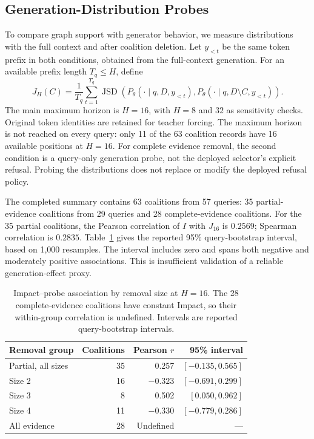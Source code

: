 \documentclass[sigconf]{aamas}
\begin{document}
\subsection{Generation-Distribution Probes}
\label{sec:probe}
To compare graph support with generator behavior, we measure distributions with the full context and after coalition deletion. Let $y_{<t}$ be the same token prefix in both conditions, obtained from the full-context generation. For an available prefix length $T_q\leq H$, define
\begin{equation}
J_H(C)=\frac{1}{T_q}\sum_{t=1}^{T_q}\operatorname{JSD}\!\left(
P_\theta(\cdot\mid q,D,y_{<t}),
P_\theta(\cdot\mid q,D\setminus C,y_{<t})\right).
\label{eq:probe}
\end{equation}
The main maximum horizon is $H=16$, with $H=8$ and $32$ as sensitivity checks. Original token identities are retained for teacher forcing. The maximum horizon is not reached on every query: only 11 of the 63 coalition records have 16 available positions at $H=16$. For complete evidence removal, the second condition is a query-only generation probe, not the deployed selector's explicit refusal. Probing the distributions does not replace or modify the deployed refusal policy.

The completed summary contains 63 coalitions from 57 queries: 35 partial-evidence coalitions from 29 queries and 28 complete-evidence coalitions. For the 35 partial coalitions, the Pearson correlation of $I$ with $J_{16}$ is $0.2569$; Spearman correlation is $0.2835$. Table~\ref{tab:probe} gives the reported 95\% query-bootstrap interval, based on 1,000 resamples. The interval includes zero and spans both negative and moderately positive associations. This is insufficient validation of a reliable generation-effect proxy.

\begin{table}[t]
\caption{Impact--probe association by removal size at $H=16$. The 28 complete-evidence coalitions have constant Impact, so their within-group correlation is undefined. Intervals are reported query-bootstrap intervals.}
\label{tab:probe}
\centering
\begin{tabular}{lrrr}
\toprule
Removal group & Coalitions & Pearson $r$ & 95\% interval\\
\midrule
Partial, all sizes & 35 & 0.257 & $[-0.135,0.565]$\\
Size 2 & 16 & $-0.323$ & $[-0.691,0.299]$\\
Size 3 & 8 & 0.502 & $[0.050,0.962]$\\
Size 4 & 11 & $-0.330$ & $[-0.779,0.286]$\\
All evidence & 28 & Undefined & ---\\
\bottomrule
\end{tabular}
\end{table}
\end{document}
